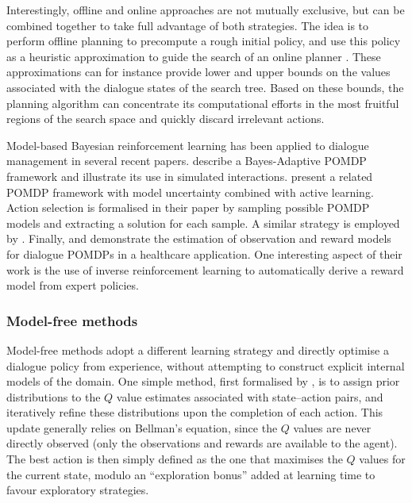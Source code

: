 Interestingly, offline and online approaches are not mutually exclusive, but can be combined together to take full advantage of both strategies.  The idea is to perform offline planning to precompute a rough initial policy, and use this policy as a heuristic approximation to guide the search of an online planner \citep{RossC07}. These approximations can for instance provide lower and upper bounds on the values associated with the dialogue states of the search tree.  Based on these bounds, the planning algorithm can concentrate its computational efforts in the most fruitful regions of the search space and quickly discard irrelevant actions. 

Model-based Bayesian reinforcement learning has been applied to dialogue management in several recent papers.  \cite{DBLP:journals/jstsp/PngPC12} describe a Bayes-Adaptive POMDP framework and illustrate its use in simulated interactions. \cite{DoshiR08} present a related POMDP framework with model uncertainty combined with active learning.  Action selection is formalised in their paper by sampling possible POMDP models and extracting a solution for each sample. A similar strategy is employed by \cite{DBLP:conf/iui/AtrashP09}.  Finally, \cite{ChinaeiC12} and \cite{chinaei2012} demonstrate the estimation of observation and reward models for dialogue POMDPs in a healthcare application.  One interesting aspect of their work is the use of inverse reinforcement learning to automatically derive a reward model from expert policies.

\subsubsection*{Model-free methods}

Model-free methods adopt a different learning strategy and directly optimise a dialogue policy from experience, without attempting to construct explicit internal models of the domain. One simple method, first formalised by \cite{Dearden:1998}, is to assign prior distributions to the $Q$ value estimates associated with state--action pairs, and iteratively refine these distributions upon the completion of each action. This update generally relies on Bellman's equation, since the $Q$ values are never directly observed (only the observations and rewards are available to the agent). The best action is then simply defined as the one that maximises the $Q$ values for the current state, modulo an ``exploration bonus'' added at learning time to favour exploratory strategies.  

